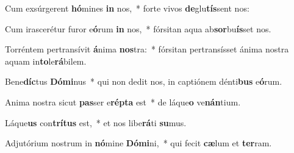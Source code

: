 \item Cum exsúrgerent \textbf{hó}mines \textbf{in} nos,~* forte vivos \textbf{de}glu\textbf{tís}sent nos:
\item Cum irascerétur furor e\textbf{ó}rum \textbf{in} nos,~* fórsitan aqua ab\textbf{sor}bu\textbf{ís}set nos.
\item Torréntem pertransívit \textbf{á}nima \textbf{nos}tra:~* fórsitan pertransísset ánima nostra aquam in\textbf{to}le\textbf{rá}bilem.
\item Bene\textbf{díc}tus \textbf{Dó}\textbf{mi}nus~* qui non dedit nos, in captiónem dénti\textbf{bus} e\textbf{ó}rum.
\item Anima nostra sicut \textbf{pas}ser e\textbf{rép}\textbf{ta} est~* de láque\textbf{o} ve\textbf{nán}tium.
\item Láque\textbf{us} con\textbf{trí}\textbf{tus} est,~* et nos libe\textbf{rá}ti \textbf{su}mus.
\item Adjutórium nostrum in \textbf{nó}mine \textbf{Dó}\textbf{mi}ni,~* qui fecit \textbf{cæ}lum et \textbf{ter}ram.
